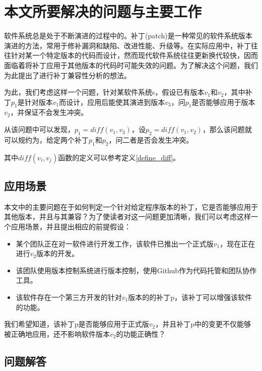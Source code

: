 \section{本文所要解决的问题与主要工作}

软件系统总是处于不断演进的过程中的。补丁(patch)是一种常见的软件系统版本演进的方法，常用于修补漏洞和缺陷、改进性能、升级等。在实际应用中，补丁往往针对某一个特定版本的代码而设计，然而现代软件系统往往更新换代较快，因而面临着将补丁应用于其他版本的代码时可能失效的问题。为了解决这个问题，我们为此提出了进行补丁兼容性分析的想法。

为此，我们考虑这样一个问题，针对某软件系统s，假设已有版本$v_1$和$v_2$，其中补丁$p_1$是针对版本$v_1$而设计，应用后能使其演进到版本$v_3$，问$p_1$是否能够应用于版本$v_{2}$，并保证不会发生冲突。

从该问题中可以发现，$p_{1} = diff(v_{1},v_{3})$，设$p_{2} = diff(v_{1},v_{2})$，那么该问题就可以规约为，给定两个补丁$p_1$和$p_2$，问二者是否会发生冲突。

其中$diff(v_i,v_j)$函数的定义可以参考定义\ref {define_diff}。

\subsection{应用场景}

本文中的主要问题在于如何判定一个针对给定程序版本的补丁，它是否能够应用于其他版本，并且与其兼容？为了使读者对这一问题更加清晰，我们可以考虑这样一个应用场景，并且提出相应的前提假设：

\begin{itemize}
	\item 某个团队正在对一软件进行开发工作，该软件已推出一个正式版$v_{1}$，现在正在进行$v_{2}$版本的开发。
	
	\item 该团队使用版本控制系统进行版本控制，使用Github作为代码托管和团队协作工具。
	
	\item 该软件存在一个第三方开发的针对$v_{1}$版本的的补丁p，该补丁可以增强该软件的功能。
	
\end{itemize}

我们希望知道，该补丁p是否能够应用于正式版$v_{2}$，并且补丁p中的变更不仅能够被正确地应用，还不影响软件版本$v_{2}$的功能正确性？

\subsection{问题解答}

